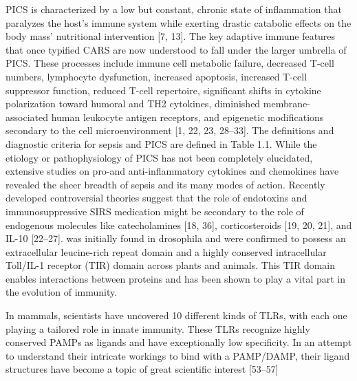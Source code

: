 PICS is characterized by a low but constant, chronic state of inflammation that paralyzes the host's immune system while exerting drastic catabolic effects on the body mass’ nutritional intervention [7, 13]. The key adaptive immune features that once typified CARS are now understood to fall under the larger umbrella of PICS. These processes include immune cell metabolic failure, decreased T-cell numbers, lymphocyte dysfunction, increased apoptosis, increased T-cell suppressor function, reduced T-cell repertoire, significant shifts in cytokine polarization toward humoral and TH2 cytokines, diminished membrane-associated human leukocyte antigen receptors, and epigenetic modifications secondary to the cell microenvironment [1, 22, 23, 28–33]. The definitions and diagnostic criteria for sepsis and PICS are defined in Table 1.1.
While the etiology or pathophysiology of PICS has not been completely elucidated, extensive studies on pro-and anti-inflammatory cytokines and chemokines have revealed the sheer breadth of sepsis and its many modes of action. Recently developed controversial theories suggest that the role of endotoxins and immunosuppressive SIRS medication might be secondary to the role of endogenous molecules like catecholamines [18, 36], corticosteroids [19, 20, 21], and IL-10 [22–27].
 was initially found in drosophila and
were confirmed to possess an extracellular leucine-rich repeat domain
and a highly conserved intracellular Toll/IL-1 receptor (TIR) domain
across plants and animals. This TIR domain enables interactions between
proteins and has been shown to play a vital part in the evolution of
immunity.~

In mammals, scientists have uncovered 10 different kinds of TLRs, with
each one playing a tailored role in innate immunity. These TLRs
recognize highly conserved PAMPs as ligands and have exceptionally low
specificity. In an attempt to understand their intricate workings to
bind with a PAMP/DAMP, their ligand structures have become a topic of
great scientific interest
{[}53--57{]}

%
%

